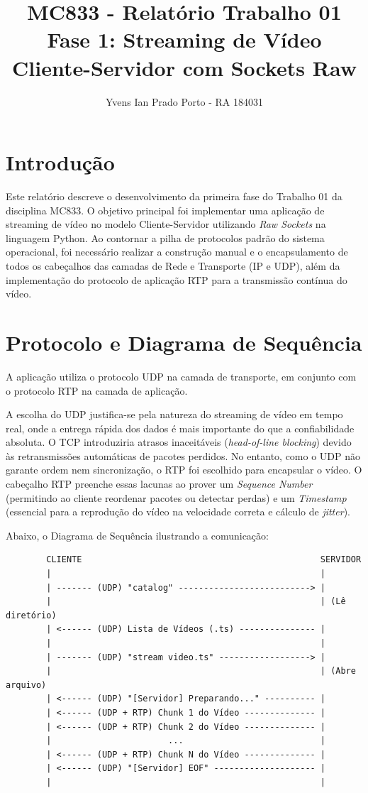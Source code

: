 \documentclass[12pt]{article}
\title{MC833 - Relatório Trabalho 01\\
Fase 1: Streaming de Vídeo Cliente-Servidor com Sockets Raw}
\author{Yvens Ian Prado Porto - RA 184031}
\date{}
\begin{document}
\maketitle

\section{Introdução}
Este relatório descreve o desenvolvimento da primeira fase do Trabalho 01 da disciplina MC833. O objetivo principal foi implementar uma aplicação de streaming de vídeo no modelo Cliente-Servidor utilizando \textit{Raw Sockets} na linguagem Python. Ao contornar a pilha de protocolos padrão do sistema operacional, foi necessário realizar a construção manual e o encapsulamento de todos os cabeçalhos das camadas de Rede e Transporte (IP e UDP), além da implementação do protocolo de aplicação RTP para a transmissão contínua do vídeo.

\section{Protocolo e Diagrama de Sequência}
A aplicação utiliza o protocolo {UDP} na camada de transporte, em conjunto com o protocolo {RTP} na camada de aplicação. 

A escolha do {UDP} justifica-se pela natureza do streaming de vídeo em tempo real, onde a entrega rápida dos dados é mais importante do que a confiabilidade absoluta. O TCP introduziria atrasos inaceitáveis (\textit{head-of-line blocking}) devido às retransmissões automáticas de pacotes perdidos. No entanto, como o UDP não garante ordem nem sincronização, o {RTP} foi escolhido para encapsular o vídeo. O cabeçalho RTP preenche essas lacunas ao prover um \textit{Sequence Number} (permitindo ao cliente reordenar pacotes ou detectar perdas) e um \textit{Timestamp} (essencial para a reprodução do vídeo na velocidade correta e cálculo de \textit{jitter}).

Abaixo, o Diagrama de Sequência ilustrando a comunicação:

\begin{center}
    \begin{verbatim}
        CLIENTE                                               SERVIDOR
        |                                                     |
        | ------- (UDP) "catalog" --------------------------> |
        |                                                     | (Lê diretório)
        | <------ (UDP) Lista de Vídeos (.ts) --------------- |
        |                                                     |
        | ------- (UDP) "stream video.ts" ------------------> |
        |                                                     | (Abre arquivo)
        | <------ (UDP) "[Servidor] Preparando..." ---------- |
        | <------ (UDP + RTP) Chunk 1 do Vídeo -------------- |
        | <------ (UDP + RTP) Chunk 2 do Vídeo -------------- |
        |                       ...                           |
        | <------ (UDP + RTP) Chunk N do Vídeo -------------- |
        | <------ (UDP) "[Servidor] EOF" -------------------- |
        |                                                     |
    \end{verbatim}
\end{center}
\end{document}
